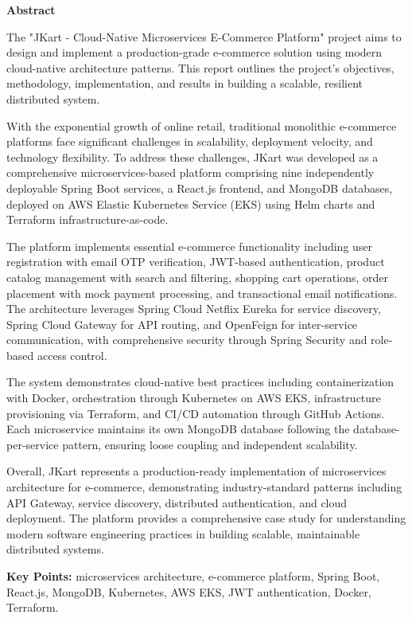 \thispagestyle{empty}
\newpage
\cleardoublepage{}
{}

\begin{center}
{\Large \bf Abstract}\\
\end{center}
\vspace{10pt}

The "JKart - Cloud-Native Microservices E-Commerce Platform" project aims to design and implement a production-grade e-commerce solution using modern cloud-native architecture patterns. This report outlines the project's objectives, methodology, implementation, and results in building a scalable, resilient distributed system.

With the exponential growth of online retail, traditional monolithic e-commerce platforms face significant challenges in scalability, deployment velocity, and technology flexibility. To address these challenges, JKart was developed as a comprehensive microservices-based platform comprising nine independently deployable Spring Boot services, a React.js frontend, and MongoDB databases, deployed on AWS Elastic Kubernetes Service (EKS) using Helm charts and Terraform infrastructure-as-code.

The platform implements essential e-commerce functionality including user registration with email OTP verification, JWT-based authentication, product catalog management with search and filtering, shopping cart operations, order placement with mock payment processing, and transactional email notifications. The architecture leverages Spring Cloud Netflix Eureka for service discovery, Spring Cloud Gateway for API routing, and OpenFeign for inter-service communication, with comprehensive security through Spring Security and role-based access control.

The system demonstrates cloud-native best practices including containerization with Docker, orchestration through Kubernetes on AWS EKS, infrastructure provisioning via Terraform, and CI/CD automation through GitHub Actions. Each microservice maintains its own MongoDB database following the database-per-service pattern, ensuring loose coupling and independent scalability.

Overall, JKart represents a production-ready implementation of microservices architecture for e-commerce, demonstrating industry-standard patterns including API Gateway, service discovery, distributed authentication, and cloud deployment. The platform provides a comprehensive case study for understanding modern software engineering practices in building scalable, maintainable distributed systems.

\vspace{0.5cm}
\noindent\textbf{Key Points:} microservices architecture, e-commerce platform, Spring Boot, React.js, MongoDB, Kubernetes, AWS EKS, JWT authentication, Docker, Terraform.
